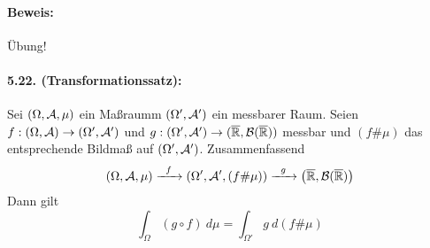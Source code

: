 \documentclass[12pt]{report}
\begin{document}
 \paragraph{Beweis:}\"Ubung!
 
 \paragraph{5.22. (Transformationssatz):}Sei $(\Omega,\mathcal{A},\mu)$ ein Ma\ss{}raumm $(\Omega',\mathcal{A}')$ ein messbarer Raum. Seien $f:(\Omega,\mathcal{A})\to(\Omega',\mathcal{A}')$ und $g:(\Omega',\mathcal{A}')\to(\overline{\mathbb{R}},\mathcal{B}(\overline{\mathbb{R}}))$ messbar und $(f\#\mu)$ das entsprechende Bildma\ss{} auf $(\Omega',\mathcal{A}')$. Zusammenfassend
 $$\left(\Omega,\A,\mu\right)\nto{f}{}\left(\Omega',\A',(f\#\mu)\right)\nto{g}{}\left(\overline\R,\cB(\overline\R)\right)$$
 Dann gilt
 $$\int_{\Omega}(g\circ f)\ d\mu=\int_{\Omega'}g\ d(f\#\mu)$$
 
\end{document}

